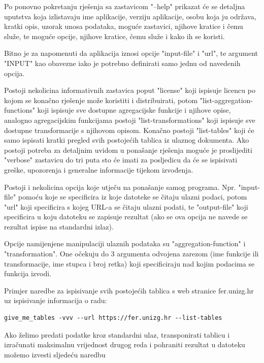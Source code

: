 \documentclass[times, utf8, zavrsni]{fer}
\begin{document}
Po ponovno pokretanju rješenja sa zastavicom "--help" prikazat će se detaljna
uputstva koja izlistavaju ime aplikacije, verziju aplikacije, osobu koja ju
održava, kratki opis, uzorak unosa podataka, moguće zastavici, njihove kratice
i čemu služe, te moguće opcije, njihove kratice, čemu služe i kako ih se
koristi.

Bitno je za napomenuti da aplikacija iznosi opcije "input-file" i "url", te
argument "INPUT" kao obavezne iako je potrebno definirati samo jednu od
navedenih opcija.

Postoji nekolicina informativnih zastavica poput "license" koji ispisuje
licencu po kojom se konačno rješenje može koristiti i distribuirati, potom
"list-aggregation-functions" koji
ispisuje sve dostupne agregacijske funkcije i njihove opise, analogno
agregacijskim funkcijama postoji "list-transformations" koji ispisuje sve
dostupne transformacije s njihovom opisom. Konačno postoji "list-tables"
koji će samo ispisati kratki pregled svih postojećih tablica iz ulaznog
dokumenta. Ako postoji potreba za detaljnim uvidom u ponašanje rješenja moguće
je proslijediti "verbose" zastavicu do tri puta sto će imati za posljedicu da
će se ispisivati greške, upozorenja i generalne informacije tijekom izvođenja.

Postoji i nekolicina opcija koje utječu na ponašanje samog programa. Npr.
"input-file" pomoću koje se specificira iz koje datoteke se čitaju ulazni
podaci, potom "url" koji specificira s kojeg URL-a se čitaju ulazni podati, te
"output-file" koji specificira u koju datoteku se zapisuje rezultat (ako se ova
opcija ne navede se rezultat ispise na standardni izlaz).

Opcije namijenjene manipulaciji ulaznih podataka su "aggregation-function" i
"transformation". One očekuju do 3 argumenta odvojena zarezom (ime funkcije ili
transformacije, ime stupca i broj retka) koji specificiraju nad kojim podacima
se funkcija izvodi.

Primjer naredbe za ispisivanje svih postojećih tablica s web stranice
fer.unizg.hr uz ispisivanje informacija o radu:

\begin{lstlisting}
give_me_tables -vvv --url https://fer.unizg.hr --list-tables
\end{lstlisting}

Ako želimo predati podatke kroz standardni ulaz, transponirati tablicu i
izračunati maksimalnu vrijednost drugog reda i pohraniti rezultat u datoteku
možemo izvesti sljedeću naredbu
\end{document}
